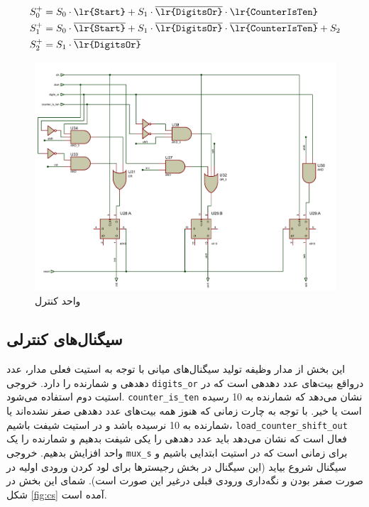 \documentclass{article}
\begin{document}
\begin{align*}
	S_0^+ &= S_0 \cdot \texttt{\lr{Start}} + S_1 \cdot \overline{\texttt{\lr{DigitsOr}}} \cdot \texttt{\lr{CounterIsTen}}\\
	S_1^+ &= S_0 \cdot \overline{\texttt{\lr{Start}}} + S_1 \cdot \overline{\texttt{\lr{DigitsOr}}} \cdot \overline{\texttt{\lr{CounterIsTen}}} + S_2\\
	S_2^+ &= S_1 \cdot \overline{\texttt{\lr{DigitsOr}}}
\end{align*}

\begin{figure}
	\centering
	\includegraphics[scale=0.4]{./graphics/controlunit}
	\caption{واحد کنترل}
	\label{fig:cu}
\end{figure}

\subsection{سیگنال‌های کنترلی}

این بخش از مدار وظیفه تولید سیگنال‌های میانی با توجه به استیت فعلی مدار، عدد دهدهی و شمارنده را دارد. خروجی \verb!digits_or! درواقع  بیت‌های عدد دهدهی است که در استیت دوم استفاده می‌شود. \verb!counter_is_ten! نشان می‌دهد که شمارنده به 10 رسیده است یا خیر. با توجه به چارت زمانی که هنوز همه بیت‌های عدد دهدهی صفر نشده‌اند یا شمارنده به 10 نرسیده باشد و در استیت شیفت باشیم،   \verb!load_counter_shift_out! فعال است که نشان می‌دهد باید عدد دهدهی را یکی شیفت بدهیم و شمارنده را یک واحد افزایش بدهیم. خروجی \verb!mux_s! برای زمانی است که در استیت ابتدایی باشیم و سیگنال شروع بیاید (این سیگنال در بخش رجیسترها برای لود کردن ورودی اولیه در صورت صفر بودن و نگه‌داری ورودی قبلی درغیر این صورت است).
شمای این بخش در شکل \ref{fig:cs} آمده است.
\end{document}
